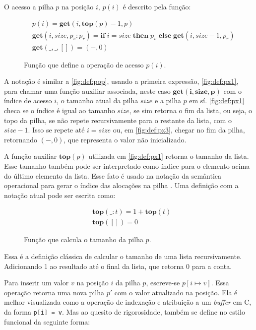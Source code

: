 O acesso a pilha $p$ na posição $i$, $p(i)$ é descrito pela função:

\begin{figure}[ht]
	\begin{align}
	&p(i) = \mathbf{get}(i, \mathbf{top}(p) - 1, p) \label{fig:def:px1}\\
	&\mathbf{get}(i, size, p_v : p_r) = \mathbf{if}\;i = size \;\mathbf{then}\;p_v\;\mathbf{else}\;\mathbf{get}(i, size - 1, p_r) \label{fig:def:px2}\\
	&\mathbf{get}(\_, \_, []) = (-,0) \label{fig:def:px3}
	\end{align}
	\caption{Função que define a operação de acesso $p(i)$.}
	\label{fig:def:px}
\end{figure}

A notação é similar a \ref{fig:def:pop}, usando a primeira expressão, \ref{fig:def:px1}, para chamar uma função auxiliar associada, neste caso $\mathbf{get(i, size, p)}$ com o índice de acesso $i$, o tamanho atual da pilha $size$ e a pilha $p$ em sí. \ref{fig:def:px1} checa se o índice é igual ao tamanho $size$, se sim retorna o fim da lista, ou seja, o topo da pilha, se não repete recursivamente para o restante da lista, com o $size - 1$. Isso se repete até $i = size$ ou, em \ref{fig:def:px3}, chegar no fim da pilha, retornando $(-,0)$, que representa o valor não inicializado.

A função auxiliar $\mathbf{top}(p)$ utilizada em \ref{fig:def:px1} retorna o tamanho da lista. Esse tamanho também pode ser interpretado como índice para o elemento acima do último elemento da lista. Esse fato é usado na notação da semântica operacional para gerar o índice das alocações na pilha . Uma definição com a notação atual pode ser escrita como:

\begin{figure}[ht]
	\begin{align}
	&\mathbf{top}(\_ : t) = 1 + \mathbf{top}(t) \label{fig:def:top1}\\
	&\mathbf{top}([]) = 0 \label{fig:def:top2}
	\end{align}
	\caption{Função que calcula o tamanho da pilha $p$.}
	\label{fig:def:top}
\end{figure}

Essa é a definição clássica de calcular o tamanho de uma lista recursivamente. Adicionando 1 ao resultado até o final da lista, que retorna 0 para a conta.

Para inserir um valor $v$ na posição $i$ da pilha $p$, escreve-se $p[i \mapsto v]$. Essa operação retorna uma nova pilha $p'$ com o valor atualizado na posição. Ela é melhor visualizada como a operação de indexação e atribuição a um \emph{buffer} em C, da forma \lstinline[language=C]|p[i] = v|. Mas ao quesito de rigorosidade, também se define no estilo funcional da seguinte forma:

